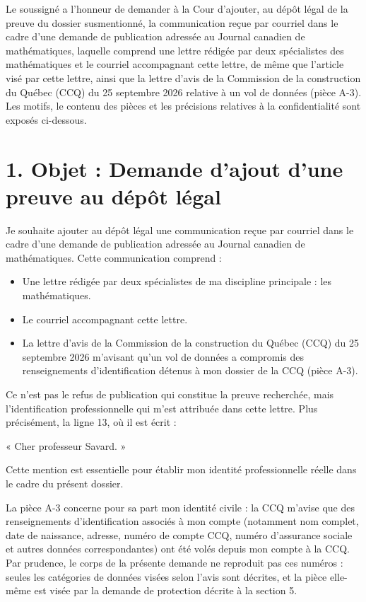 \documentclass[12pt,a4paper]{article}
\begin{document}
Le soussigné a l’honneur de demander à la Cour d’ajouter, au dépôt légal de la preuve du dossier susmentionné, la communication reçue par courriel dans le cadre d’une demande de publication adressée au Journal canadien de mathématiques, laquelle comprend une lettre rédigée par deux spécialistes des mathématiques et le courriel accompagnant cette lettre, de même que l’article visé par cette lettre, ainsi que la lettre d’avis de la Commission de la construction du Québec (CCQ) du 25 septembre 2026 relative à un vol de données (pièce A-3). Les motifs, le contenu des pièces et les précisions relatives à la confidentialité sont exposés ci-dessous.

\section*{1. Objet : Demande d’ajout d’une preuve au dépôt légal}
Je souhaite ajouter au dépôt légal une communication reçue par courriel dans le cadre d’une demande de publication adressée au Journal canadien de mathématiques. Cette communication comprend :

\begin{itemize}
  \item Une lettre rédigée par deux spécialistes de ma discipline principale : les mathématiques.
  \item Le courriel accompagnant cette lettre.

  \item La lettre d’avis de la Commission de la construction du Québec (CCQ) du 25 septembre 2026 m’avisant qu’un vol de données a compromis des renseignements d’identification détenus à mon dossier de la CCQ (pièce A-3).
\end{itemize}

Ce n’est pas le refus de publication qui constitue la preuve recherchée, mais l’identification professionnelle qui m’est attribuée dans cette lettre. Plus précisément, la ligne 13, où il est écrit :

« Cher professeur Savard. »

Cette mention est essentielle pour établir mon identité professionnelle réelle dans le cadre du présent dossier.



La pièce A-3 concerne pour sa part mon identité civile : la CCQ m’avise que des renseignements d’identification associés à mon compte (notamment nom complet, date de naissance, adresse, numéro de compte CCQ, numéro d’assurance sociale et autres données correspondantes) ont été volés depuis mon compte à la CCQ. Par prudence, le corps de la présente demande ne reproduit pas ces numéros : seules les catégories de données visées selon l’avis sont décrites, et la pièce elle-même est visée par la demande de protection décrite à la section 5.
\end{document}

